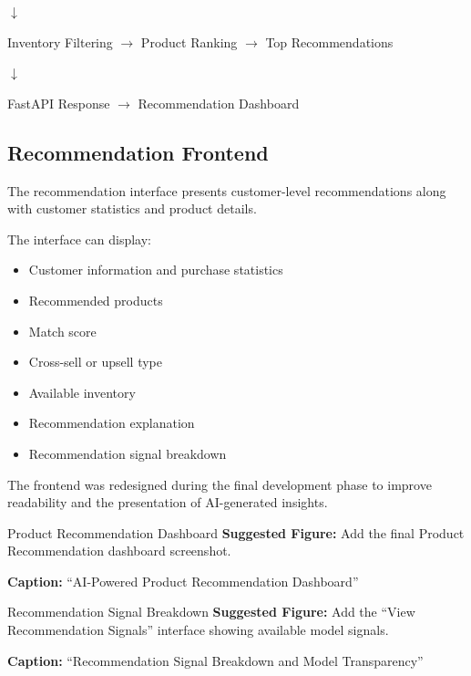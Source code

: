 \documentclass[12pt,a4paper]{report}
\begin{document}
\begin{center}
$\downarrow$
\end{center}

\begin{center}
Inventory Filtering
$\rightarrow$
Product Ranking
$\rightarrow$
Top Recommendations
\end{center}

\begin{center}
$\downarrow$
\end{center}

\begin{center}
FastAPI Response
$\rightarrow$
Recommendation Dashboard
\end{center}


\subsection{Recommendation Frontend}

The recommendation interface presents customer-level recommendations
along with customer statistics and product details.

The interface can display:

\begin{itemize}[leftmargin=1.2cm]
    \item Customer information and purchase statistics
    \item Recommended products
    \item Match score
    \item Cross-sell or upsell type
    \item Available inventory
    \item Recommendation explanation
    \item Recommendation signal breakdown
\end{itemize}

The frontend was redesigned during the final development phase to
improve readability and the presentation of AI-generated insights.

\begin{screenshotplaceholder}{Product Recommendation Dashboard}
\textbf{Suggested Figure:} Add the final Product Recommendation
dashboard screenshot.

\textbf{Caption:} ``AI-Powered Product Recommendation Dashboard''
\end{screenshotplaceholder}

\begin{screenshotplaceholder}{Recommendation Signal Breakdown}
\textbf{Suggested Figure:} Add the ``View Recommendation Signals''
interface showing available model signals.

\textbf{Caption:} ``Recommendation Signal Breakdown and Model Transparency''
\end{screenshotplaceholder}
\end{document}
